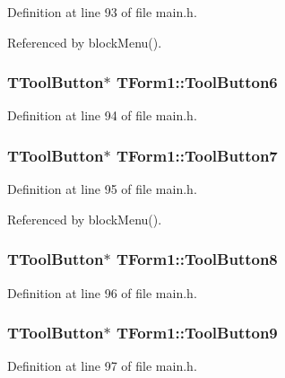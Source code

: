 Definition at line 93 of file main.h.

Referenced by blockMenu().\hypertarget{classTForm1_f716972f3abf585457033528a9c3f03c}{
\subsubsection[ToolButton6]{\setlength{\rightskip}{0pt plus 5cm}TToolButton$\ast$ {\bf TForm1::ToolButton6}}}
\label{classTForm1_f716972f3abf585457033528a9c3f03c}




Definition at line 94 of file main.h.\hypertarget{classTForm1_ece2f6432ce9ba88a0de83283c7621d3}{
\subsubsection[ToolButton7]{\setlength{\rightskip}{0pt plus 5cm}TToolButton$\ast$ {\bf TForm1::ToolButton7}}}
\label{classTForm1_ece2f6432ce9ba88a0de83283c7621d3}




Definition at line 95 of file main.h.

Referenced by blockMenu().\hypertarget{classTForm1_77d558c092eb5fc084d253e4da0a02c7}{
\subsubsection[ToolButton8]{\setlength{\rightskip}{0pt plus 5cm}TToolButton$\ast$ {\bf TForm1::ToolButton8}}}
\label{classTForm1_77d558c092eb5fc084d253e4da0a02c7}




Definition at line 96 of file main.h.\hypertarget{classTForm1_dab7a30ee8cee50b2e417c4c1bc5ec47}{
\subsubsection[ToolButton9]{\setlength{\rightskip}{0pt plus 5cm}TToolButton$\ast$ {\bf TForm1::ToolButton9}}}
\label{classTForm1_dab7a30ee8cee50b2e417c4c1bc5ec47}




Definition at line 97 of file main.h.

